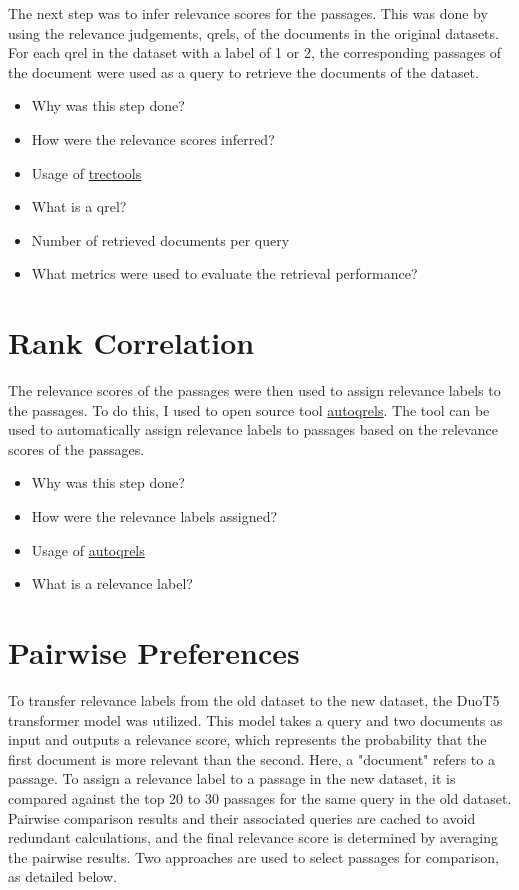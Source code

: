 The next step was to infer relevance scores for the passages. This was done by using the relevance judgements, qrels, of the documents in the original datasets. For each qrel in the dataset with a label of 1 or 2, the corresponding passages of the document were used as a query to retrieve the documents of the dataset. 

\begin{itemize}
    \item Why was this step done?
    \item How were the relevance scores inferred?
    \item Usage of \href{https://github.com/joaopalotti/trectools}{trectools}
    \item What is a qrel?
    \item Number of retrieved documents per query
    \item What metrics were used to evaluate the retrieval performance?
\end{itemize}

\section{Rank Correlation}\label{rank-correlation-scores}

The relevance scores of the passages were then used to assign relevance labels to the passages. To do this, I used to open source tool \href{https://github.com/seanmacavaney/autoqrels}{autoqrels}. The tool can be used to automatically assign relevance labels to passages based on the relevance scores of the passages.

\begin{itemize}
    \item Why was this step done?
    \item How were the relevance labels assigned?
    \item Usage of \href{https://github.com/seanmacavaney/autoqrels}{autoqrels}
    \item What is a relevance label?
\end{itemize}


\section{Pairwise Preferences}\label{pairwise-transfering-relevance-labels-across-datasets}

To transfer relevance labels from the old dataset to the new dataset, the DuoT5 transformer model was utilized. This model takes a query and two documents as input and outputs a relevance score, which represents the probability that the first document is more relevant than the second. Here, a "document" refers to a passage. To assign a relevance label to a passage in the new dataset, it is compared against the top 20 to 30 passages for the same query in the old dataset. Pairwise comparison results and their associated queries are cached to avoid redundant calculations, and the final relevance score is determined by averaging the pairwise results. Two approaches are used to select passages for comparison, as detailed below.

